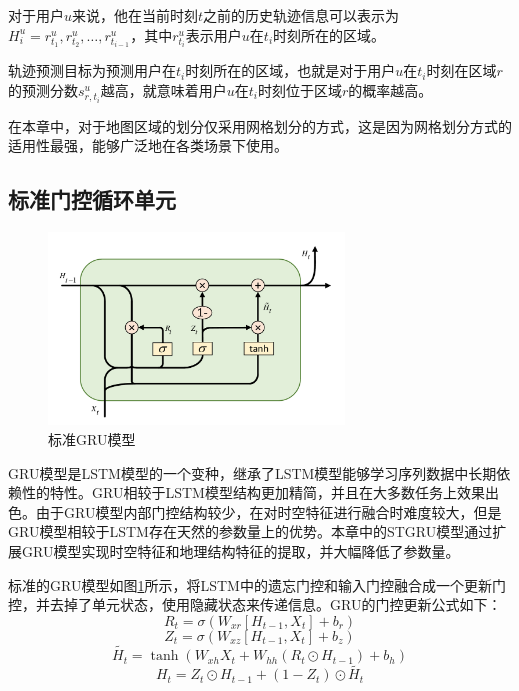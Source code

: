 \documentclass[master]{thesis-uestc}
\begin{document}
对于用户$u$来说，他在当前时刻$t$之前的历史轨迹信息可以表示为$H_i^u = {r_{t_1}^u, r_{t_2}^u, \dots, r_{t_{i-1}}^u}$，其中$r_{t_i}^u$表示用户$u$在$t_i$时刻所在的区域。

轨迹预测目标为预测用户在$t_i$时刻所在的区域，也就是对于用户$u$在$t_i$时刻在区域$r$的预测分数$s^u_{r,t_i}$越高，就意味着用户$u$在$t_i$时刻位于区域$r$的概率越高。

在本章中，对于地图区域的划分仅采用网格划分的方式，这是因为网格划分方式的适用性最强，能够广泛地在各类场景下使用。

\subsection{标准门控循环单元}

\begin{figure}[!ht]
\centering 
\includegraphics[width=0.7\textwidth]{./pic/gru.pdf}
\caption{标准GRU模型}
\label{Figure.3.2}
\end{figure}

GRU模型是LSTM模型的一个变种，继承了LSTM模型能够学习序列数据中长期依赖性的特性。GRU相较于LSTM模型结构更加精简，并且在大多数任务上效果出色。由于GRU模型内部门控结构较少，在对时空特征进行融合时难度较大，但是GRU模型相较于LSTM存在天然的参数量上的优势。本章中的STGRU模型通过扩展GRU模型实现时空特征和地理结构特征的提取，并大幅降低了参数量。

标准的GRU模型如图\ref{Figure.3.2}所示，将LSTM中的遗忘门控和输入门控融合成一个更新门控，并去掉了单元状态，使用隐藏状态来传递信息。GRU的门控更新公式如下：
\begin{equation}
   R_t = \sigma(W_{xr}[H_{t-1},X_t]+b_r)
\end{equation}
\begin{equation}
   Z_t = \sigma(W_{xz}[H_{t-1},X_t]+b_z)
\end{equation}
\begin{equation}
   \tilde{H_t} = \tanh(W_{xh}X_t + W_{hh}(R_t \odot H_{t-1})+b_h)
\label{eq.3.1}
\end{equation}
\begin{equation}
  H_t = Z_t\odot H_{t-1}+(1-Z_t)\odot \tilde{H_t}
\label{eq.3.2}
\end{equation}
\end{document}
